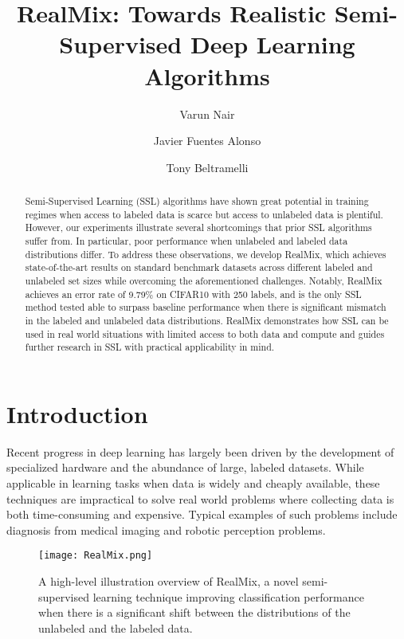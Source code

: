 \documentclass[10pt,twocolumn,letterpaper]{article}
\begin{document}
\title{RealMix: Towards Realistic Semi-Supervised Deep Learning Algorithms}
\author[1,2]{Varun Nair}
\author[2]{Javier Fuentes Alonso}
\author[2]{Tony Beltramelli}
\maketitle


\begin{abstract}
   Semi-Supervised Learning (SSL) algorithms have shown great potential in training regimes when access to labeled data is scarce but access to unlabeled data is plentiful. However, our experiments illustrate several shortcomings that prior SSL algorithms suffer from. In particular, poor performance when unlabeled and labeled data distributions differ. To address these observations, we develop RealMix, which achieves state-of-the-art results on standard benchmark datasets across different labeled and unlabeled set sizes while overcoming the aforementioned challenges. Notably, RealMix achieves an error rate of 9.79\% on CIFAR10 with 250 labels, and is the only SSL method tested able to surpass baseline performance when there is significant mismatch in the labeled and unlabeled data distributions. RealMix demonstrates how SSL can be used in real world situations with limited access to both data and compute and guides further research in SSL with practical applicability in mind.
\end{abstract}


\section{Introduction}
\label{introduction}

Recent progress in deep learning has largely been driven by the development of specialized hardware and the abundance of large, labeled datasets. While applicable in learning tasks when data is widely and cheaply available, these techniques are impractical to solve real world problems where collecting data is both time-consuming and expensive. Typical examples of such problems include diagnosis from medical imaging and robotic perception problems.

\begin{figure}[t!]
    \texttt{[image: RealMix.png]}
    \caption{A high-level illustration overview of RealMix, a novel semi-supervised learning technique improving classification performance when there is a  significant shift between the distributions of the unlabeled and the labeled data.}
    \label{fig:realmix_overview}
\end{figure}
\end{document}
